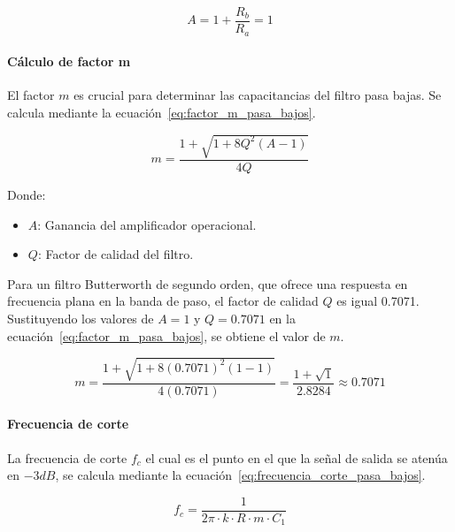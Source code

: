         \begin{equation}
            \label{eq:funcion_amplificador_operacional_pasa_bajos}
            A = 1 + \frac{R_b}{R_a} = 1
        \end{equation}

        \paragraph{Cálculo de factor m}
        El factor $m$ es crucial para determinar las capacitancias del filtro pasa bajas. Se calcula mediante la ecuación~\ref{eq:factor_m_pasa_bajos}.

        \begin{equation}
            \label{eq:factor_m_pasa_bajos}
            m = \frac{1+\sqrt{1+8Q^2(A-1)}}{4Q}
        \end{equation}

        Donde:

        \begin{itemize}
            \item $A$: Ganancia del amplificador operacional.
            \item $Q$: Factor de calidad del filtro.
        \end{itemize}

        Para un filtro Butterworth de segundo orden, que ofrece una respuesta en frecuencia plana en la banda de paso, el factor de calidad $Q$ es igual 0.7071. Sustituyendo los valores de $A = 1$ y $Q = 0.7071$ en la ecuación~\ref{eq:factor_m_pasa_bajos}, se obtiene el valor de $m$.

        \begin{equation}
            \label{eq:factor_m_pasa_bajos_valor}
            m = \frac{1+\sqrt{1+8(0.7071)^2(1-1)}}{4(0.7071)} = \frac{1 + \sqrt{1}}{2.8284}\approx 0.7071
        \end{equation}

        \paragraph{Frecuencia de corte}
        La frecuencia de corte $f_c$ el cual es el punto en el que la señal de salida se atenúa en $-3 dB$, se calcula mediante la ecuación~\ref{eq:frecuencia_corte_pasa_bajos}.

        \begin{equation}
            \label{eq:frecuencia_corte_pasa_bajos}
            f_c = \frac{1}{2\pi \cdot k \cdot R \cdot m \cdot C_1}
        \end{equation}

